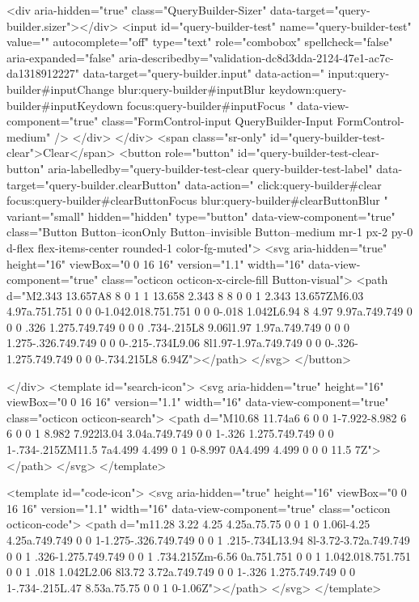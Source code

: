             <div aria-hidden="true" class="QueryBuilder-Sizer" data-target="query-builder.sizer"></div>
            <input id="query-builder-test" name="query-builder-test" value="" autocomplete="off" type="text" role="combobox" spellcheck="false" aria-expanded="false" aria-describedby="validation-dc8d3dda-2124-47e1-ac7c-da1318912227" data-target="query-builder.input" data-action="
          input:query-builder#inputChange
          blur:query-builder#inputBlur
          keydown:query-builder#inputKeydown
          focus:query-builder#inputFocus
        " data-view-component="true" class="FormControl-input QueryBuilder-Input FormControl-medium" />
          </div>
        </div>
          <span class="sr-only" id="query-builder-test-clear">Clear</span>
          <button role="button" id="query-builder-test-clear-button" aria-labelledby="query-builder-test-clear query-builder-test-label" data-target="query-builder.clearButton" data-action="
                click:query-builder#clear
                focus:query-builder#clearButtonFocus
                blur:query-builder#clearButtonBlur
              " variant="small" hidden="hidden" type="button" data-view-component="true" class="Button Button--iconOnly Button--invisible Button--medium mr-1 px-2 py-0 d-flex flex-items-center rounded-1 color-fg-muted">  <svg aria-hidden="true" height="16" viewBox="0 0 16 16" version="1.1" width="16" data-view-component="true" class="octicon octicon-x-circle-fill Button-visual">
    <path d="M2.343 13.657A8 8 0 1 1 13.658 2.343 8 8 0 0 1 2.343 13.657ZM6.03 4.97a.751.751 0 0 0-1.042.018.751.751 0 0 0-.018 1.042L6.94 8 4.97 9.97a.749.749 0 0 0 .326 1.275.749.749 0 0 0 .734-.215L8 9.06l1.97 1.97a.749.749 0 0 0 1.275-.326.749.749 0 0 0-.215-.734L9.06 8l1.97-1.97a.749.749 0 0 0-.326-1.275.749.749 0 0 0-.734.215L8 6.94Z"></path>
</svg>
</button>

      </div>
      <template id="search-icon">
  <svg aria-hidden="true" height="16" viewBox="0 0 16 16" version="1.1" width="16" data-view-component="true" class="octicon octicon-search">
    <path d="M10.68 11.74a6 6 0 0 1-7.922-8.982 6 6 0 0 1 8.982 7.922l3.04 3.04a.749.749 0 0 1-.326 1.275.749.749 0 0 1-.734-.215ZM11.5 7a4.499 4.499 0 1 0-8.997 0A4.499 4.499 0 0 0 11.5 7Z"></path>
</svg>
</template>

<template id="code-icon">
  <svg aria-hidden="true" height="16" viewBox="0 0 16 16" version="1.1" width="16" data-view-component="true" class="octicon octicon-code">
    <path d="m11.28 3.22 4.25 4.25a.75.75 0 0 1 0 1.06l-4.25 4.25a.749.749 0 0 1-1.275-.326.749.749 0 0 1 .215-.734L13.94 8l-3.72-3.72a.749.749 0 0 1 .326-1.275.749.749 0 0 1 .734.215Zm-6.56 0a.751.751 0 0 1 1.042.018.751.751 0 0 1 .018 1.042L2.06 8l3.72 3.72a.749.749 0 0 1-.326 1.275.749.749 0 0 1-.734-.215L.47 8.53a.75.75 0 0 1 0-1.06Z"></path>
</svg>
</template>

